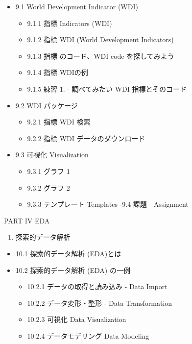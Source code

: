 \documentclass[
  xelatex, ja=standard]{bxjsbook}
\providecommand{\tightlist}{%
  \setlength{\itemsep}{0pt}\setlength{\parskip}{0pt}}
\theoremstyle{definition}
\theoremstyle{definition}
\theoremstyle{definition}
\theoremstyle{definition}
\theoremstyle{remark}
\begin{document}
\begin{itemize}
\tightlist
\item
  9.1 World Development Indicator (WDI)

  \begin{itemize}
  \tightlist
  \item
    9.1.1 指標 Indicators (WDI)
  \item
    9.1.2 指標 WDI (World Development Indicators)
  \item
    9.1.3 指標 のコード、WDI code を探してみよう
  \item
    9.1.4 指標 WDIの例
  \item
    9.1.5 練習 1. - 調べてみたい WDI 指標とそのコード
  \end{itemize}
\item
  9.2 WDI パッケージ

  \begin{itemize}
  \tightlist
  \item
    9.2.1 指標 WDI 検索
  \item
    9.2.2 指標 WDI データのダウンロード
  \end{itemize}
\item
  9.3 可視化 Visualization

  \begin{itemize}
  \tightlist
  \item
    9.3.1 グラフ 1
  \item
    9.3.2 グラフ 2
  \item
    9.3.3 テンプレート Templates -9.4 課題　Assignment
  \end{itemize}
\end{itemize}

PART IV EDA

\begin{enumerate}
\def\labelenumi{\arabic{enumi}.}
\setcounter{enumi}{40}
\tightlist
\item
  探索的データ解析
\end{enumerate}

\begin{itemize}
\tightlist
\item
  10.1 探索的データ解析 (EDA)とは
\item
  10.2 探索的データ解析 (EDA) の一例

  \begin{itemize}
  \tightlist
  \item
    10.2.1 データの取得と読み込み - Data Import
  \item
    10.2.2 データ変形・整形 - Data Transformation
  \item
    10.2.3 可視化 Data Visualization
  \item
    10.2.4 データモデリング Data Modeling
  \end{itemize}
\end{itemize}
\end{document}
